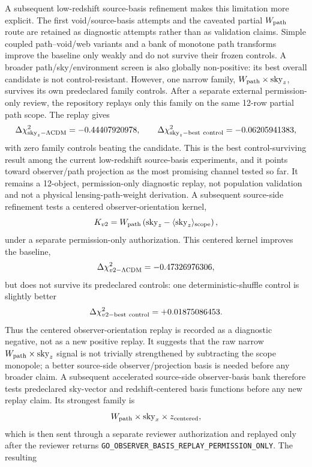 \documentclass[11pt]{article}
\begin{document}
A subsequent low-redshift source-basis refinement makes this limitation more
explicit. The first void/source-basis attempts and the caveated partial
\(W_{\rm path}\) route are retained as diagnostic attempts rather than as
validation claims. Simple coupled path--void/web variants and a bank of
monotone path transforms improve the baseline only weakly and do not survive
their frozen controls. A broader path/sky/environment screen is also globally
non-positive: its best overall candidate is not control-resistant. However, one
narrow family, \(W_{\rm path}\times\mathrm{sky}_z\), survives its own
predeclared family controls. After a separate external permission-only review,
the repository replays only this family on the same 12-row partial path scope.
The replay gives
\[
  \Delta\chi^2_{\mathrm{sky}_z-\Lambda{\rm CDM}}=-0.44407920978,
  \qquad
  \Delta\chi^2_{\mathrm{sky}_z-{\rm best\ control}}=-0.06205941383,
\]
with zero family controls beating the candidate. This is the best
control-surviving result among the current low-redshift source-basis
experiments, and it points toward observer/path projection as the most
promising channel tested so far. It remains a 12-object, permission-only
diagnostic replay, not population validation and not a physical
lensing-path-weight derivation.  A subsequent source-side refinement tests a
centered observer-orientation kernel,
\[
  K_{v2}=W_{\rm path}\left(\mathrm{sky}_z-\langle \mathrm{sky}_z\rangle_{\rm scope}\right),
\]
under a separate permission-only authorization.  This centered kernel improves
the baseline,
\[
  \Delta\chi^2_{v2-\Lambda{\rm CDM}}=-0.47326976306,
\]
but does not survive its predeclared controls: one deterministic-shuffle
control is slightly better
\[
  \Delta\chi^2_{v2-{\rm best\ control}}=+0.01875086453.
\]
Thus the centered observer-orientation replay is recorded as a diagnostic
negative, not as a new positive replay.  It suggests that the raw narrow
\(W_{\rm path}\times\mathrm{sky}_z\) signal is not trivially strengthened by
subtracting the scope monopole; a better source-side observer/projection basis
is needed before any broader claim.  A subsequent accelerated source-side
observer-basis bank therefore tests predeclared sky-vector and redshift-centered
basis functions before any new replay claim.  Its strongest family is
\[
  W_{\rm path}\times \mathrm{sky}_x\times z_{\rm centered},
\]
which is then sent through a separate reviewer authorization and replayed only
after the reviewer returns
\texttt{GO\_\allowbreak{}OBSERVER\_\allowbreak{}BASIS\_\allowbreak{}REPLAY\_\allowbreak{}PERMISSION\_\allowbreak{}ONLY}.  The resulting
\end{document}
